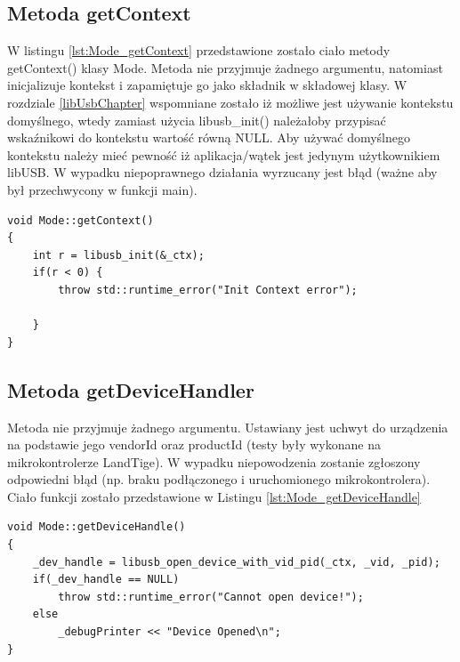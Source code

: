 \documentclass{BscUS}
\begin{document}
\subsection{Metoda getContext}
W listingu \ref{lst:Mode_getContext} przedstawione zostało ciało metody getContext() klasy Mode.
\newline
Metoda nie przyjmuje żadnego argumentu, natomiast inicjalizuje kontekst i zapamiętuje go jako składnik w składowej klasy. W rozdziale \ref{libUsbChapter} wspomniane zostało iż możliwe jest używanie kontekstu domyślnego, wtedy zamiast użycia libusb\_init() należałoby przypisać wskaźnikowi do kontekstu wartość równą NULL. 
\newline
Aby używać domyślnego kontekstu należy mieć pewność iż aplikacja/wątek jest jedynym użytkownikiem libUSB.
\newline
W wypadku niepoprawnego działania wyrzucany jest błąd (ważne aby był przechwycony w funkcji main).
\begin{lstlisting}[caption={Metoda Mode::getContext()},label={lst:Mode_getContext}]
void Mode::getContext()
{	
	int r = libusb_init(&_ctx);
	if(r < 0) {
		throw std::runtime_error("Init Context error");

	}
}
\end{lstlisting}
\subsection{Metoda getDeviceHandler}
Metoda nie przyjmuje żadnego argumentu. Ustawiany jest uchwyt do urządzenia na podstawie jego vendorId oraz productId (testy były wykonane na mikrokontrolerze LandTige). W wypadku niepowodzenia zostanie zgłoszony odpowiedni błąd (np. braku podłączonego i uruchomionego mikrokontrolera).
Ciało funkcji zostało przedstawione w Listingu \ref{lst:Mode_getDeviceHandle}
\begin{lstlisting}[caption={Metoda Mode::getDeviceHandler()},label={lst:Mode_getDeviceHandle}]
void Mode::getDeviceHandle()
{
	_dev_handle = libusb_open_device_with_vid_pid(_ctx, _vid, _pid);
	if(_dev_handle == NULL)
		throw std::runtime_error("Cannot open device!");
	else
		_debugPrinter << "Device Opened\n";
}
\end{lstlisting}
\end{document}

